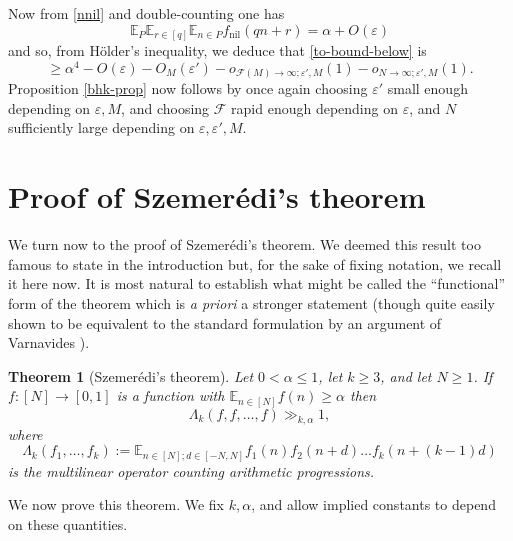 \documentclass[11pt,reqno]{amsart}
\numberwithin{equation}{section}
\theoremstyle{plain}
\newtheorem{theorem}[subsection]{Theorem}
\theoremstyle{definition}
\renewcommand{\leq}{\leqslant}
\renewcommand{\geq}{\geqslant}
\newcommand\E{{\mathbb{E}}}
\newcommand\1{{\bf 1}}
\newcommand\2{{\bf 2}}
\newcommand\eps{\varepsilon}
\newcommand\nil{{\operatorname{nil}}}
\newcommand\Grow{{\mathcal F}}
\begin{document}
Now from \eqref{nnil} and double-counting one has
$$ \E_P \E_{r \in [q]} \E_{n \in P} f_\nil(qn+r) = \alpha + O(\eps)$$ and so, from H\"older's inequality, we deduce that \eqref{to-bound-below} is 
\[ \geq \alpha^4 - O(\eps) - O_M(\eps') - o_{\Grow(M) \to \infty; \eps',M}(1) - o_{N \to \infty;\eps',M}(1).\]
Proposition \ref{bhk-prop} now follows by once again choosing $\eps'$ small enough depending on $\eps,M$, and choosing $\Grow$ rapid enough depending on $\eps$, and $N$ sufficiently large depending on $\eps,\eps',M$.

\newcommand\vol{\operatorname{vol}}
\section{Proof of Szemer\'edi's theorem}\label{szem-sec}

We turn now to the proof of Szemer\'edi's theorem. We deemed this result too famous to state in the introduction but, for the sake of fixing notation, we recall it here now. It is most natural to establish what might be called the ``functional'' form of the theorem which is \emph{a priori} a stronger statement (though quite easily shown to be equivalent to the standard formulation by an argument of Varnavides \cite{var}).

\begin{theorem}[Szemer\'edi's theorem]\label{szthm}
Let $0 < \alpha \leq 1$, let $k \geq 3$, and let $N \geq 1$.   If $f : [N] \rightarrow [0,1]$ is a function with $\E_{n \in [N]} f(n) \geq \alpha$ then 
\[ \Lambda_k(f,f,\dots,f) \gg_{k,\alpha} 1,\] 
where
\[ \Lambda_k(f_1,\dots,f_k) := \E_{n \in [N]; d \in [-N,N]} f_1(n) f_2(n+d) \dots f_k(n + (k-1)d)\] is the multilinear operator counting arithmetic progressions.
\end{theorem}

We now prove this theorem.  We fix $k, \alpha$, and allow implied constants to depend on these quantities.
\end{document}
